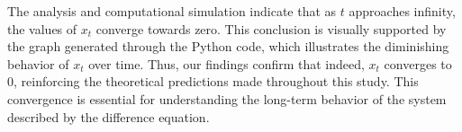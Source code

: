 \documentclass [a4paper]{article}
\begin{document}
The analysis and computational simulation indicate that as \(t\) approaches infinity, the values of \(x_t\) converge towards zero. This conclusion is visually supported by the graph generated through the Python code, which illustrates the diminishing behavior of \(x_t\) over time. Thus, our findings confirm that indeed, \(x_t\) converges to \(0\), reinforcing the theoretical predictions made throughout this study. This convergence is essential for understanding the long-term behavior of the system described by the difference equation.
 
\end{document}
